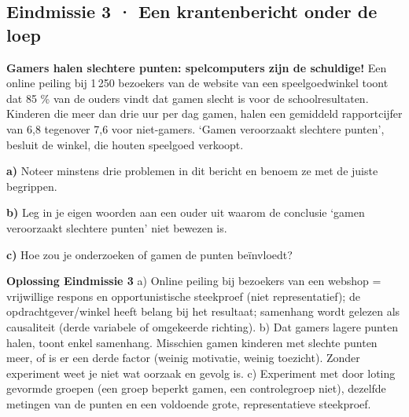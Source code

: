 \subsection*{Eindmissie 3 · Een krantenbericht onder de loep}

\begin{voorbeeld}
\textbf{Gamers halen slechtere punten: spelcomputers zijn de schuldige!} Een online peiling bij 1\,250 bezoekers van de website van een speelgoedwinkel toont dat 85 \% van de ouders vindt dat gamen slecht is voor de schoolresultaten. Kinderen die meer dan drie uur per dag gamen, halen een gemiddeld rapportcijfer van 6,8 tegenover 7,6 voor niet-gamers. ‘Gamen veroorzaakt slechtere punten’, besluit de winkel, die houten speelgoed verkoopt.
\end{voorbeeld}

\textbf{a)} Noteer minstens drie problemen in dit bericht en benoem ze met de juiste begrippen. \lijn

\textbf{b)} Leg in je eigen woorden aan een ouder uit waarom de conclusie ‘gamen veroorzaakt slechtere punten’ niet bewezen is. \lijn

\textbf{c)} Hoe zou je onderzoeken of gamen de punten beïnvloedt? \lijn

\begin{oplossing}
\textbf{Oplossing Eindmissie 3} \quad a) Online peiling bij bezoekers van een webshop = vrijwillige respons en opportunistische steekproef (niet representatief); de opdrachtgever/winkel heeft belang bij het resultaat; samenhang wordt gelezen als causaliteit (derde variabele of omgekeerde richting). b) Dat gamers lagere punten halen, toont enkel samenhang. Misschien gamen kinderen met slechte punten meer, of is er een derde factor (weinig motivatie, weinig toezicht). Zonder experiment weet je niet wat oorzaak en gevolg is. c) Experiment met door loting gevormde groepen (een groep beperkt gamen, een controlegroep niet), dezelfde metingen van de punten en een voldoende grote, representatieve steekproef.
\end{oplossing}
